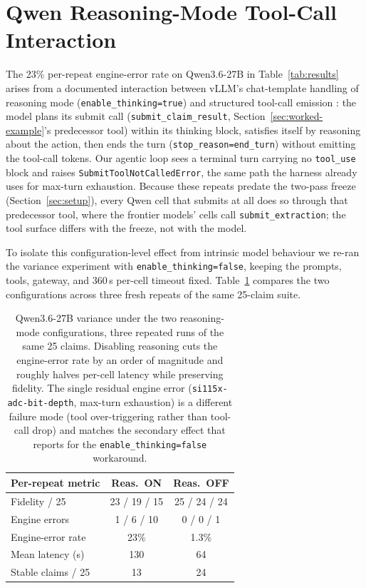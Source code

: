 \documentclass[11pt]{article}
\begin{document}
\section{Qwen Reasoning-Mode Tool-Call Interaction}
\label{sec:appendix-qwen-thinking}

The 23\% per-repeat engine-error rate on Qwen3.6-27B in
Table~\ref{tab:results} arises from a documented interaction between
vLLM's chat-template handling of reasoning mode
(\texttt{enable\_thinking=true}) and structured tool-call emission
\citep{qwen3issue1817}: the model plans its submit call
(\texttt{submit\_claim\_result}, Section~\ref{sec:worked-example}'s
predecessor tool) within its thinking block, satisfies itself by
reasoning about the action, then ends the turn
(\texttt{stop\_reason=end\_turn}) without emitting the tool-call tokens.
Our agentic loop sees a terminal turn carrying no \texttt{tool\_use}
block and raises \texttt{SubmitToolNotCalledError}, the same path the
harness already uses for max-turn exhaustion. Because these repeats
predate the two-pass freeze (Section~\ref{sec:setup}), every Qwen cell
that submits at all does so through that predecessor tool, where the
frontier models' cells call \texttt{submit\_extraction}; the tool
surface differs with the freeze, not with the model.

To isolate this configuration-level effect from intrinsic model
behaviour we re-ran the variance experiment with
\texttt{enable\_thinking=false}, keeping the prompts, tools, gateway,
and 360\,s per-cell timeout fixed.
Table~\ref{tab:qwen-thinking} compares the two configurations across
three fresh repeats of the same 25-claim suite.

\begin{table}[ht]
\centering
\small
\setlength{\tabcolsep}{4pt}
\begin{tabular}{@{}lcc@{}}
\toprule
\textbf{Per-repeat metric} & \textbf{Reas.\ ON} & \textbf{Reas.\ OFF} \\
\midrule
Fidelity / 25            & 23 / 19 / 15 & 25 / 24 / 24 \\
Engine errors            & 1 / 6 / 10   & 0 / 0 / 1    \\
Engine-error rate        & 23\%         & 1.3\%        \\
Mean latency (s)         & 130          & 64           \\
Stable claims / 25       & 13           & 24           \\
\bottomrule
\end{tabular}
\caption{Qwen3.6-27B variance under the two reasoning-mode
configurations, three repeated runs of the same 25 claims. Disabling
reasoning cuts the engine-error rate by an order of magnitude and
roughly halves per-cell latency while preserving fidelity. The single
residual engine error (\texttt{si115x-adc-bit-depth}, max-turn
exhaustion) is a different failure mode (tool over-triggering rather
than tool-call drop) and matches the secondary effect that
\citet{qwen3issue1817} reports for the \texttt{enable\_thinking=false}
workaround.}
\label{tab:qwen-thinking}
\end{table}
\end{document}
